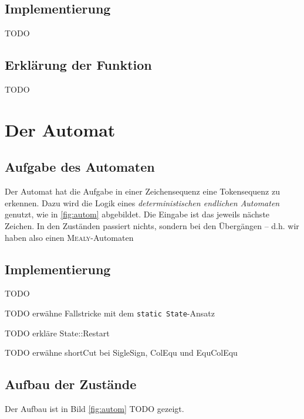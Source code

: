 \documentclass[
a4paper,   %
11pt,      %
oneside,   %
onecolumn, %
final      %
]{article}
\newcommand{\code}[1]{\lstinline$#1$}
\begin{document}
\subsection{Implementierung}
TODO

\subsection{Erklärung der Funktion}
TODO


\section{Der Automat}

\subsection{Aufgabe des Automaten}
Der Automat hat die Aufgabe in einer Zeichensequenz eine Tokensequenz zu erkennen. Dazu wird die Logik eines \emph{deterministischen endlichen Automaten} genutzt, wie in \ref{fig:autom} abgebildet. Die Eingabe ist das jeweils nächste Zeichen. In den Zuständen passiert nichts, sondern bei den Übergängen -- d.h. wir haben also einen \textsc{Mealy}-Automaten

\subsection{Implementierung}
TODO

TODO erwähne Fallstricke mit dem \code{static State}-Ansatz

TODO erkläre State::Restart

TODO erwähne shortCut bei SigleSign, ColEqu und EquColEqu

\subsection{Aufbau der Zustände}

Der Aufbau ist in Bild \ref{fig:autom} TODO gezeigt.

\end{document}
